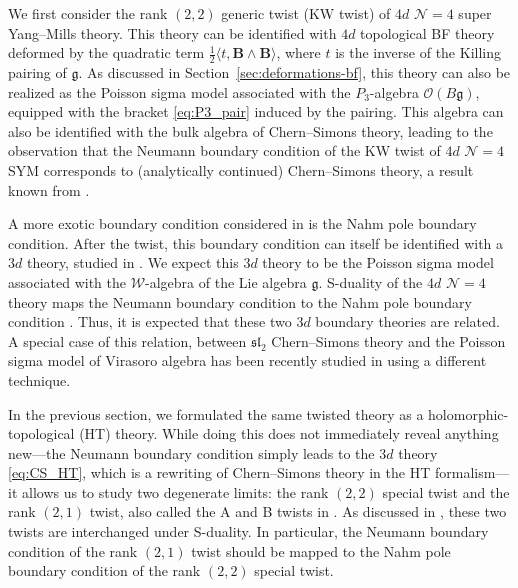 \documentclass[11pt]{article}
\numberwithin{equation}{section}
\begin{document}
We first consider the rank $(2,2)$ generic twist (KW twist) of $4d$ $\mathcal{N} = 4$ super Yang--Mills theory. This theory can be identified with $4d$ topological BF theory deformed by the quadratic term $\frac{1}{2}\langle t, \boldsymbol{B}\wedge\boldsymbol{B}\rangle$, where $t$ is the inverse of the Killing pairing of $\mathfrak{g}$. As discussed in Section~\ref{sec:deformations-bf}, this theory can also be realized as the Poisson sigma model associated with the $P_3$-algebra $\mathcal{O}(B\mathfrak{g})$, equipped with the bracket \eqref{eq:P3_pair} induced by the pairing. This algebra can also be identified with the bulk algebra of Chern--Simons theory, leading to the observation that the Neumann boundary condition of the KW twist of $4d$ $\mathcal{N} = 4$ SYM corresponds to (analytically continued) Chern--Simons theory, a result known from \cite{witten2010new,witten2011fivebranes}.

A more exotic boundary condition considered in \cite{Gaiotto:2008sa} is the Nahm pole boundary condition. After the twist, this boundary condition can itself be identified with a $3d$ theory, studied in \cite{butson2016degenerate}. We expect this $3d$ theory to be the Poisson sigma model associated with the $\mathcal{W}$-algebra of the Lie algebra $\mathfrak{g}$. S-duality of the $4d$ $\mathcal{N} = 4$ theory maps the Neumann boundary condition to the Nahm pole boundary condition \cite{gaiotto2009s}. Thus, it is expected that these two $3d$ boundary theories are related. A special case of this relation, between $\mathfrak{sl}_2$ Chern--Simons theory and the Poisson sigma model of Virasoro algebra has been recently studied in \cite{Gaiotto:2026qai} using a different technique.

In the previous section, we formulated the same twisted theory as a holomorphic-topological (HT) theory. While doing this does not immediately reveal anything new---the Neumann boundary condition simply leads to the $3d$ theory \eqref{eq:CS_HT}, which is a rewriting of Chern--Simons theory in the HT formalism---it allows us to study two degenerate limits: the rank $(2,2)$ special twist and the rank $(2,1)$ twist, also called the A and B twists in \cite{elliott2018geometric}. As discussed in \cite{Raghavendran:2019zdq}, these two twists are interchanged under S-duality. In particular, the Neumann boundary condition of the rank $(2,1)$ twist should be mapped to the Nahm pole boundary condition of the rank $(2,2)$ special twist.
\end{document}
